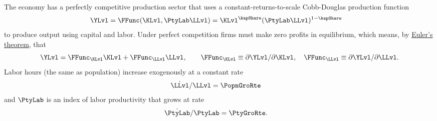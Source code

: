 \documentclass{econark}
\begin{document}
The economy has a perfectly competitive production sector that uses a constant-returns-to-scale Cobb-Douglas production function
\begin{equation}\begin{gathered}\begin{aligned}
                   \YLvl & =  \FFunc(\KLvl,\PtyLab \LLvl) = \KLvl^{\kapShare}(\PtyLab \LLvl)^{1-\kapShare}
\end{aligned}\end{gathered}\end{equation}
to produce output using capital and labor.  Under perfect competition firms must make zero profits in equilibrium, which means, by \href{https://intertemporal-choice.github.io/content/appendices/mathematical/mathfactslist/\#fact-eulerstheorem}{Euler's theorem}, that
\begin{equation}
  \YLvl = \FFunc_{\KLvl}\KLvl + \FFunc_{\LLvl}\LLvl , \qquad \FFunc_{\KLvl} \equiv \partial\YLvl/\partial\KLvl , \quad \FFunc_{\LLvl} \equiv \partial\YLvl/\partial\LLvl . \label{eq:RCK-outputExhausted}
\end{equation}
Labor hours (the same as population) increase exogenously at a constant rate
\begin{equation}\begin{gathered}\begin{aligned}
  \dot{\LLvl}/\LLvl & =  \PopnGroRte
\end{aligned}\end{gathered}\end{equation}
and $\PtyLab$ is an index of labor productivity that grows at rate
\begin{equation}\begin{gathered}\begin{aligned}
  \dot{\PtyLab }/\PtyLab  & =  \PtyGroRte.
\end{aligned}\end{gathered}\end{equation}
\end{document}
